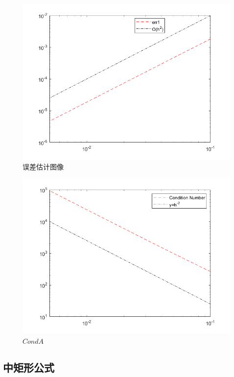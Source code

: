 \documentclass{article}
\begin{document}
\begin{figure}[H]
{\begin{minipage}[t]{0.3\linewidth}
\includegraphics[scale=0.3]{中心差分和有限体积法的中矩形公式/err1.png}
\end{minipage}
}
\caption{\label{solution_image}误差估计图像}
\end{figure}

\begin{figure}[H]
\centering
\includegraphics[scale=0.5]{中心差分和有限体积法的中矩形公式/CondA.png}
\caption{\label{CondA}$CondA$}
\end{figure}

\newpage
\subsection{中矩形公式}
\end{document}
